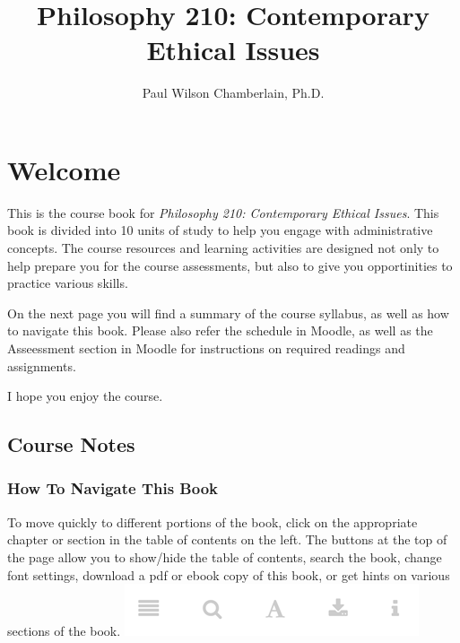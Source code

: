 \documentclass[
]{book}
\title{Philosophy 210: Contemporary Ethical Issues}
\author{Paul Wilson Chamberlain, Ph.D.}
\date{}
\begin{document}
\maketitle

{
\setcounter{tocdepth}{1}
\tableofcontents
}
\hypertarget{welcome}{%
\chapter*{Welcome}\label{welcome}}

This is the course book for \emph{Philosophy 210: Contemporary Ethical Issues}. This book is divided into 10 units of study to help you engage with administrative concepts. The course resources and learning activities are designed not only to help prepare you for the course assessments, but also to give you opportinities to practice various skills.

On the next page you will find a summary of the course syllabus, as well as how to navigate this book. Please also refer the schedule in Moodle, as well as the Asseessment section in Moodle for instructions on required readings and assignments.

I hope you enjoy the course.

\hypertarget{course-notes}{%
\section*{Course Notes}\label{course-notes}}

\hypertarget{how-to-navigate-this-book}{%
\subsection*{How To Navigate This Book}\label{how-to-navigate-this-book}}

To move quickly to different portions of the book, click on the appropriate chapter or section in the table of contents on the left. The buttons at the top of the page allow you to show/hide the table of contents, search the book, change font settings, download a pdf or ebook copy of this book, or get hints on various sections of the book.
\includegraphics{assets/course-intro/menu.png}
\end{document}
